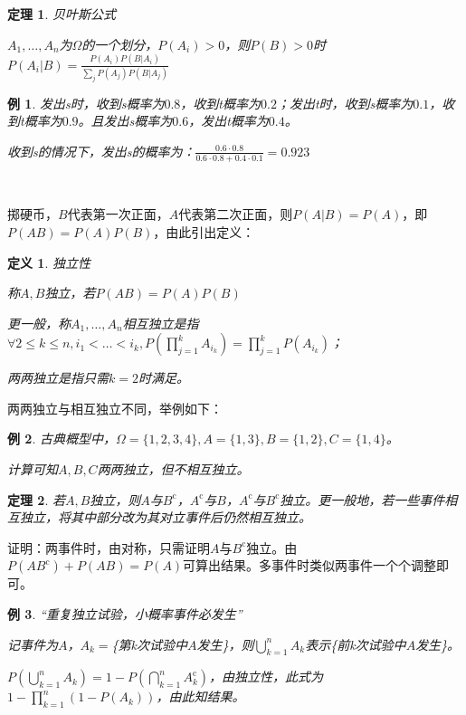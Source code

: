 \documentclass[a4paper,UTF8,fontset=windows]{ctexart}
\newtheorem{thm}{定理}[section]
\newtheorem{exmp}{例}[section]
\newtheorem{defi}{定义}[section]
\begin{document}
\begin{thm} 贝叶斯公式

$A_1,\dots,A_n$为$\Omega$的一个划分，$P(A_i)>0$，则$P(B)>0$时$P(A_i|B)=\frac{P(A_i)P(B|A_i)}{\sum_jP(A_j)P(B|A_j)}$
\end{thm}

\begin{exmp} 发出s时，收到s概率为$0.8$，收到t概率为$0.2$；发出t时，收到s概率为$0.1$，收到t概率为$0.9$。且发出s概率为$0.6$，发出t概率为$0.4$。
	
收到s的情况下，发出s的概率为：$\frac{0.6\cdot0.8}{0.6\cdot0.8+0.4\cdot0.1}=0.923$

\end{exmp}

~

掷硬币，$B$代表第一次正面，$A$代表第二次正面，则$P(A|B)=P(A)$，即$P(AB)=P(A)P(B)$，由此引出定义：

\begin{defi} 独立性
	
称$A,B$独立，若$P(AB)=P(A)P(B)$

更一般，称$A_1,\dots,A_n$\emph{相互独立}是指$\forall2\le k\le n,i_1<\dots<i_k,P(\prod_{j=1}^kA_{i_k})=\prod_{j=1}^kP(A_{i_k})$；

\emph{两两独立}是指只需$k=2$时满足。
\end{defi}

两两独立与相互独立不同，举例如下：

\begin{exmp}
古典概型中，$\Omega=\{1,2,3,4\},A=\{1,3\},B=\{1,2\},C=\{1,4\}$。

计算可知$A,B,C$两两独立，但不相互独立。
\end{exmp}

\begin{thm}
若$A,B$独立，则$A$与$B^\mathrm{c}$，$A^\mathrm{c}$与$B$，$A^\mathrm{c}$与$B^\mathrm{c}$独立。更一般地，若一些事件相互独立，将其中部分改为其对立事件后仍然相互独立。
\end{thm}

证明：两事件时，由对称，只需证明$A$与$B^\mathrm{c}$独立。由$P(AB^\mathrm{c})+P(AB)=P(A)$可算出结果。多事件时类似两事件一个个调整即可。

\begin{exmp} “重复独立试验，小概率事件必发生”

记事件为$A$，$A_k=$\{第k次试验中$A$发生\}，则$\bigcup_{k=1}^nA_k$表示\{前k次试验中$A$发生\}。

$P(\bigcup_{k=1}^nA_k)=1-P(\bigcap_{k=1}^nA_k^\mathrm{c})$，由独立性，此式为$1-\prod_{k=1}^n(1-P(A_k))$，由此知结果。
\end{exmp}
\end{document}
